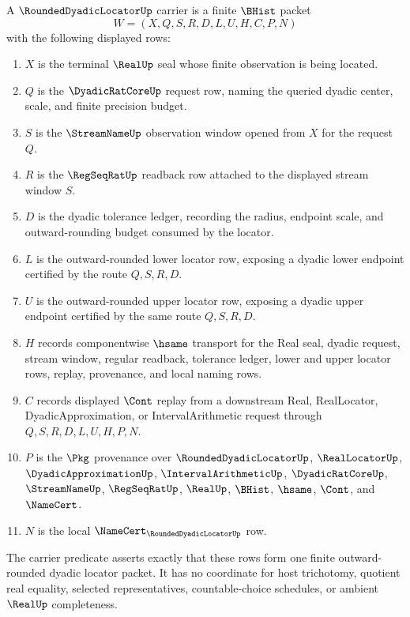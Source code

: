 \begin{definition}
\label{def:rounded-dyadic-locator-carrier}
A $\RoundedDyadicLocatorUp$ carrier is a finite $\BHist$ packet
$$
W=(X,Q,S,R,D,L,U,H,C,P,N)
$$
with the following displayed rows:
\begin{enumerate}
\item $X$ is the terminal $\RealUp$ seal whose finite observation is being located.
\item $Q$ is the $\DyadicRatCoreUp$ request row, naming the queried dyadic center, scale, and finite precision budget.
\item $S$ is the $\StreamNameUp$ observation window opened from $X$ for the request $Q$.
\item $R$ is the $\RegSeqRatUp$ readback row attached to the displayed stream window $S$.
\item $D$ is the dyadic tolerance ledger, recording the radius, endpoint scale, and outward-rounding budget consumed by the locator.
\item $L$ is the outward-rounded lower locator row, exposing a dyadic lower endpoint certified by the route $Q,S,R,D$.
\item $U$ is the outward-rounded upper locator row, exposing a dyadic upper endpoint certified by the same route $Q,S,R,D$.
\item $H$ records componentwise $\hsame$ transport for the Real seal, dyadic request, stream window, regular readback, tolerance ledger, lower and upper locator rows, replay, provenance, and local naming rows.
\item $C$ records displayed $\Cont$ replay from a downstream Real, RealLocator, DyadicApproximation, or IntervalArithmetic request through $Q,S,R,D,L,U,H,P,N$.
\item $P$ is the $\Pkg$ provenance over $\RoundedDyadicLocatorUp$, $\RealLocatorUp$, $\DyadicApproximationUp$, $\IntervalArithmeticUp$, $\DyadicRatCoreUp$, $\StreamNameUp$, $\RegSeqRatUp$, $\RealUp$, $\BHist$, $\hsame$, $\Cont$, and $\NameCert$.
\item $N$ is the local $\NameCert_{\RoundedDyadicLocatorUp}$ row.
\end{enumerate}
The carrier predicate asserts exactly that these rows form one finite outward-rounded dyadic locator packet. It has no coordinate for host trichotomy, quotient real equality, selected representatives, countable-choice schedules, or ambient $\RealUp$ completeness.
\end{definition}


